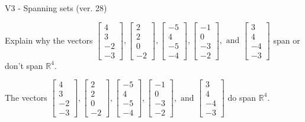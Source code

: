 \begin{exercise}
  \begin{exerciseTitle}V3 - Spanning sets (ver. 28)\end{exerciseTitle}
  \begin{exerciseStatement}
    Explain why the vectors \(\left[\begin{array}{r}
4 \\
3 \\
-2 \\
-3
\end{array}\right] , \left[\begin{array}{r}
2 \\
2 \\
0 \\
-2
\end{array}\right] , \left[\begin{array}{r}
-5 \\
4 \\
-5 \\
-4
\end{array}\right] , \left[\begin{array}{r}
-1 \\
0 \\
-3 \\
-2
\end{array}\right] , \text{ and } \left[\begin{array}{r}
3 \\
4 \\
-4 \\
-3
\end{array}\right]\) span or don't span \(\mathbb{R}^4\). 
	


  \end{exerciseStatement}
  \begin{exerciseAnswer}
   The vectors \(\left[\begin{array}{r}
4 \\
3 \\
-2 \\
-3
\end{array}\right] , \left[\begin{array}{r}
2 \\
2 \\
0 \\
-2
\end{array}\right] , \left[\begin{array}{r}
-5 \\
4 \\
-5 \\
-4
\end{array}\right] , \left[\begin{array}{r}
-1 \\
0 \\
-3 \\
-2
\end{array}\right] , \text{ and } \left[\begin{array}{r}
3 \\
4 \\
-4 \\
-3
\end{array}\right]\) 
  	 do  
	span \(\mathbb{R}^4\).
  



\end{exerciseAnswer}
\end{exercise}

